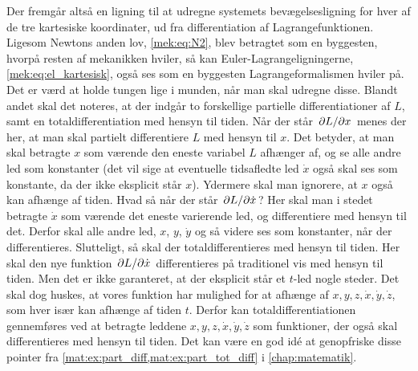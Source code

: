 Der fremgår altså en ligning til at udregne systemets bevægelsesligning for hver af de tre kartesiske koordinater, ud fra differentiation af Lagrangefunktionen. Ligesom Newtons anden lov, \cref{mek:eq:N2}, blev betragtet som en byggesten, hvorpå resten af mekanikken hviler, så kan Euler-Lagrangeligningerne, \cref{mek:eq:el_kartesisk}, også ses som en byggesten Lagrangeformalismen hviler på. Det er værd at holde tungen lige i munden, når man skal udregne disse. Blandt andet skal det noteres, at der indgår to forskellige partielle differentiationer af $L$, samt en totaldifferentiation med hensyn til tiden. Når der står $\pdv*{L}{x}$ menes der her, at man skal partielt differentiere $L$ med hensyn til $x$. Det betyder, at man skal betragte $x$ som værende den eneste variabel $L$ afhænger af, og se alle andre led som konstanter (det vil sige at eventuelle tidsafledte led $\dot{x}$ også skal ses som konstante, da der ikke eksplicit står $x$). Ydermere skal man ignorere, at $x$ også kan afhænge af tiden. Hvad så når der står $\pdv*{L}{\dot{x}}$? Her skal man i stedet betragte $\dot{x}$ som værende det eneste varierende led, og differentiere med hensyn til det. Derfor skal alle andre led, $x$, $y$, $\dot{y}$ og så videre ses som konstanter, når der differentieres. Slutteligt, så skal der totaldifferentieres med hensyn til tiden. Her skal den nye funktion $\pdv*{L}{\dot{x}}$ differentieres på traditionel vis med hensyn til tiden. Men det er ikke garanteret, at der eksplicit står et $t$-led nogle steder. Det skal dog huskes, at vores funktion har mulighed for at afhænge af $x,y,z,\dot{x},\dot{y},\dot{z}$, som hver især kan afhænge af tiden $t$. Derfor kan totaldifferentiationen gennemføres ved at betragte leddene $x,y,z,\dot{x},\dot{y},\dot{z}$ som funktioner, der også skal differentieres med hensyn til tiden. Det kan være en god idé at genopfriske disse pointer fra \cref{mat:ex:part_diff,mat:ex:part_tot_diff} i \cref{chap:matematik}.
%

